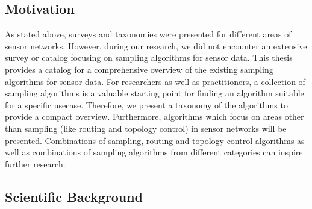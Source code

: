 
\subsection{Motivation}
\label{sec:motivation}

As stated above, surveys and taxonomies were presented for different areas of
sensor networks. However, during our research, we did not encounter an
extensive survey or catalog focusing on sampling algorithms for sensor data.
This thesis provides a catalog for a comprehensive overview of the existing
sampling algorithms for sensor data. For researchers as well as practitioners,
a collection of sampling algorithms is a valuable starting point for finding an
algorithm suitable for a specific usecase. Therefore, we present a taxonomy of
the algorithms to provide a compact overview. Furthermore, algorithms which
focus on areas other than sampling (like routing and topology control) in
sensor networks will be presented. Combinations of sampling, routing and
topology control algorithms as well as combinations of sampling algorithms from
different categories can inspire further research.


\subsection{Scientific Background}
\label{sec:Scientific Background}

